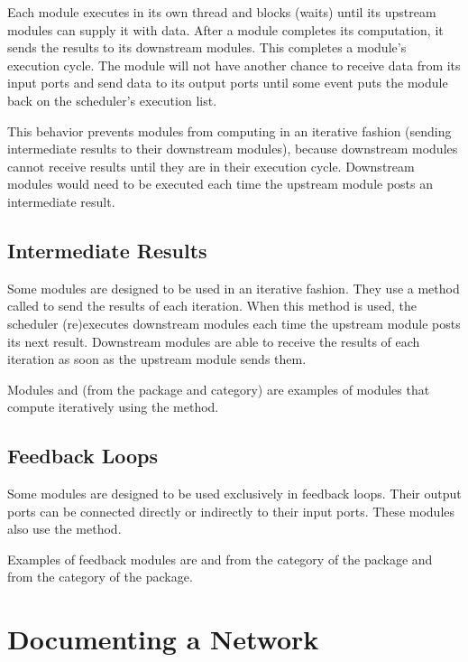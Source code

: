 Each module executes in its own thread and blocks (waits) until its upstream
modules can supply it with data.  After a module completes its computation,
it sends the results to its downstream modules.  This completes a module's
execution cycle.  The module will not have another chance to receive data from its input ports
and send data to its output ports until some event
puts the  module back on the scheduler's execution list.  

This behavior prevents modules from computing in an iterative fashion 
(sending intermediate results to their downstream modules), because
downstream modules cannot receive results until they are in their
execution cycle. Downstream modules would need to be executed each time the
upstream module posts an intermediate result.


\subsection{Intermediate Results}

Some modules are designed to be used in an iterative fashion. They use
a method called  to send the results of each
iteration.  When this method is used, the scheduler (re)executes
downstream modules each time the upstream module posts its next
result.  Downstream modules are able to receive the results of each
iteration as soon as the upstream module sends them.

Modules  and  (from the
\package{\sr} package and  category) are examples of modules
that compute iteratively using the  method.

\subsection{Feedback Loops}

Some modules are designed to be used exclusively in feedback
loops. Their output ports can be connected
directly or indirectly to their input ports.  These modules also use the
 method.

Examples of feedback modules are  and
 from the  category of the
 package and  from the
 category of the  package.

\section{Documenting a Network}
\label{sec:docnetwork}

